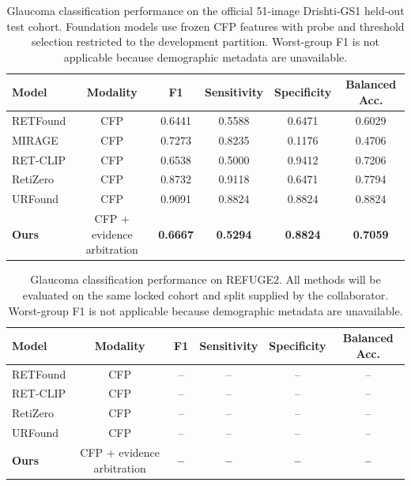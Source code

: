 \begin{table}[t]
\centering
\caption{Glaucoma classification performance on the official 51-image
Drishti-GS1 held-out test cohort. Foundation models use frozen CFP features
with probe and threshold selection restricted to the development partition.
Worst-group F1 is not applicable because demographic metadata are unavailable.}
\label{tab:glaucoma_drishtigs}
\begin{tabular}{lccccc}
\toprule
\textbf{Model} & \textbf{Modality} & \textbf{F1} & \textbf{Sensitivity} & \textbf{Specificity} & \textbf{Balanced Acc.} \\
\midrule
RETFound & CFP & 0.6441 & 0.5588 & 0.6471 & 0.6029 \\
MIRAGE & CFP & 0.7273 & 0.8235 & 0.1176 & 0.4706 \\
RET-CLIP & CFP & 0.6538 & 0.5000 & 0.9412 & 0.7206 \\
RetiZero & CFP & 0.8732 & 0.9118 & 0.6471 & 0.7794 \\
URFound & CFP & 0.9091 & 0.8824 & 0.8824 & 0.8824 \\
\textbf{Ours} & CFP + evidence arbitration & \textbf{0.6667} & \textbf{0.5294} & \textbf{0.8824} & \textbf{0.7059} \\
\bottomrule
\end{tabular}
\end{table}

\begin{table}[t]
\centering
\caption{Glaucoma classification performance on REFUGE2. All methods will be
evaluated on the same locked cohort and split supplied by the collaborator.
Worst-group F1 is not applicable because demographic metadata are unavailable.}
\label{tab:glaucoma_refuge2}
\begin{tabular}{lccccc}
\toprule
\textbf{Model} & \textbf{Modality} & \textbf{F1} & \textbf{Sensitivity} & \textbf{Specificity} & \textbf{Balanced Acc.} \\
\midrule
RETFound & CFP & -- & -- & -- & -- \\
RET-CLIP & CFP & -- & -- & -- & -- \\
RetiZero & CFP & -- & -- & -- & -- \\
URFound & CFP & -- & -- & -- & -- \\
\textbf{Ours} & CFP + evidence arbitration & \textbf{--} & \textbf{--} & \textbf{--} & \textbf{--} \\
\bottomrule
\end{tabular}
\end{table}

